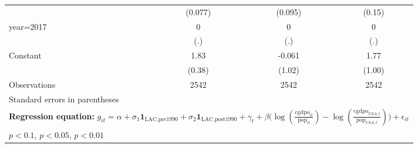 \begin{sidewaystable}[htbp]
\begin{tabular}{l*{3}{c}}
                &  (0.077)         &  (0.095)         &   (0.15)         \\
\addlinespace
year=2017       &        0         &        0         &        0         \\
                &      (.)         &      (.)         &      (.)         \\
\addlinespace
Constant        &     1.83\sym{***}&   -0.061         &     1.77\sym{*}  \\
                &   (0.38)         &   (1.02)         &   (1.00)         \\
\midrule
Observations    &     2542         &     2542         &     2542         \\
\bottomrule
\multicolumn{4}{l}{\footnotesize Standard errors in parentheses}\\
\multicolumn{4}{l}{\footnotesize \textbf{Regression equation:} \(g_{it} = \alpha + \sigma_1 \mathbf{1}_{\textrm{LAC,pre1990}} + \sigma_2 \mathbf{1}_{\textrm{LAC,post1990}} + \gamma_t + \beta \big(\log (\frac{\textrm{cgdpo}_{it}}{\textrm{pop}_{it}} ) - \log (\frac{\textrm{cgdpo}_{USA,t}}{\textrm{pop}_{USA,t}}  ) \big) + \epsilon_{it}\)}\\
\multicolumn{4}{l}{\footnotesize \sym{*} \(p<0.1\), \sym{**} \(p<0.05\), \sym{***} \(p<0.01\)}\\
\end{tabular}
\end{sidewaystable}
